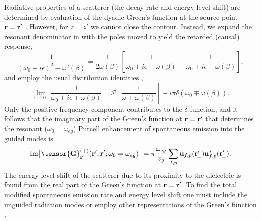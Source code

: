 \documentclass[preprint, aps,pra,onecolumn]{revtex4-1} %
\begin{document}
Radiative properties of a scatterer (the decay rate and energy level shift) are determined by evaluation of the dyadic Green's function at the source point $\mathbf{r} = \mathbf{r}'$ \cite{fussell_decay_2005}.  However, for $z=z'$ we cannot close the contour. Instead, we expand the resonant denominator in  with the poles moved to yield the retarded (causal) response,
\begin{equation}
\frac{1}{(\omega_0+i\epsilon)^2-\omega^2(\beta)}=\frac{1}{2 \omega(\beta)}\left[ \frac{1}{\omega_0+ i 
\epsilon - \omega(\beta)} - \frac{1}{\omega_0+ i \epsilon + \omega(\beta)} \right],
\end{equation}
 and employ the usual distribution identities \cite{sondergaard_general_2001},
\begin{equation}
\lim_{\epsilon \rightarrow 0_+} \frac{1}{\omega_0 + i \epsilon \mp 
\omega(\beta)}=\mathcal{P}\left[\frac{1}{\omega \mp \omega(\beta)} \right] + i \pi \delta (\omega_0 \mp 
\omega(\beta)).
\end{equation}
Only the positive-frequency component contributes to the $\delta$-function, and it follows that the imaginary part of the Green's function at $\mathbf{r} = \mathbf{r}'$ that determines the resonant ($\omega_0 = \omega_{eg}$) Purcell enhancement of spontaneous emission into the guided modes is \cite{dung_spontaneous_2000, fussell_decay_2005, chen_finite-element_2010}
	\begin{equation}\label{Eq::ImGreenLocal}
		{\rm Im} \big[\tensor{\mathbf{G}}^{(+)}_g(\br',\br'; \omega_0=\omega_{eg}) \big] = \pi \frac{\omega_{eg}}{v_g } \sum_{f, p} 
		\mathbf{u}_{f, p} (\br_{\!\perp}^\prime)\mathbf{u}^*_{f , p} (\br_{\!\perp}^\prime).
	\end{equation}
The energy level shift of the scatterer due to its proximity to the dielectric is found from the real part of the Green's function at $\mathbf{r} = \mathbf{r}'$. 
To find the total modified spontaneous emission rate and energy level shift one must include the unguided radiation modes \cite{le_kien_spontaneous_2005} or employ other representations of the Green's function \cite{klimov_spontaneous_2004}.  
\end{document}
